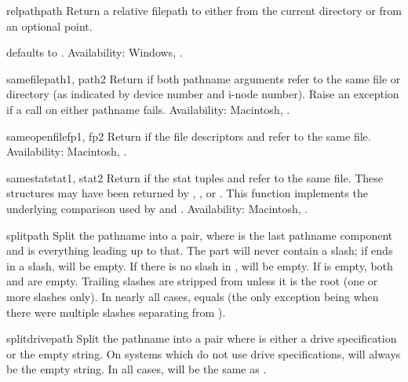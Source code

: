 \begin{funcdesc}{relpath}{path}
Return a relative filepath to  either from the current
directory or from an optional  point.

 defaults to .
Availability:  Windows, \UNIX.
\end{funcdesc}

\begin{funcdesc}{samefile}{path1, path2}
Return  if both pathname arguments refer to the same file or
directory (as indicated by device number and i-node number).
Raise an exception if a  call on either pathname
fails.
Availability:  Macintosh, \UNIX.
\end{funcdesc}

\begin{funcdesc}{sameopenfile}{fp1, fp2}
Return  if the file descriptors  and  refer
to the same file.
Availability:  Macintosh, \UNIX.
\end{funcdesc}

\begin{funcdesc}{samestat}{stat1, stat2}
Return  if the stat tuples  and  refer to
the same file.  These structures may have been returned by
, , or .  This
function implements the underlying comparison used by
 and .
Availability:  Macintosh, \UNIX.
\end{funcdesc}

\begin{funcdesc}{split}{path}
Split the pathname  into a pair,  where  is the last pathname component and
 is everything leading up to that.  The  part will
never contain a slash; if  ends in a slash,  will
be empty.  If there is no slash in ,  will be
empty.  If  is empty, both  and  are
empty.  Trailing slashes are stripped from  unless it is the
root (one or more slashes only).  In nearly all cases,
 equals  (the only
exception being when there were multiple slashes separating 
from ).
\end{funcdesc}

\begin{funcdesc}{splitdrive}{path}
Split the pathname  into a pair  where  is either a drive specification or the
empty string.  On systems which do not use drive specifications,
 will always be the empty string.  In all cases,
 will be the same as .
\end{funcdesc}

